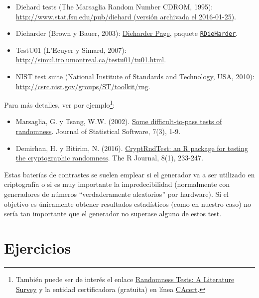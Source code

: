 \documentclass[
]{book}
\theoremstyle{break}
\theoremstyle{definition}
\theoremstyle{definition}
\theoremstyle{definition}
\theoremstyle{definition}
\theoremstyle{remark}
\begin{document}
\begin{itemize}
\item
  Diehard tests (The Marsaglia Random Number CDROM, 1995):
  \href{https://web.archive.org/web/20160125103112/http://stat.fsu.edu/pub/diehard}{http://www.stat.fsu.edu/pub/diehard (versión archivada el 2016-01-25)}.
\item
  Dieharder (Brown y Bauer, 2003):
  \href{https://webhome.phy.duke.edu/~rgb/General/dieharder.php}{Dieharder Page},
  paquete \href{https://github.com/eddelbuettel/rdieharder}{\texttt{RDieHarder}}.
\item
  TestU01 (L'Ecuyer y Simard, 2007):
  \url{http://simul.iro.umontreal.ca/testu01/tu01.html}.
\item
  NIST test suite (National Institute of Standards and Technology, USA, 2010):
  \url{http://csrc.nist.gov/groups/ST/toolkit/rng}.
\end{itemize}

Para más detalles, ver por ejemplo\footnote{También puede ser de interés el enlace \href{http://www.ciphersbyritter.com/RES/RANDTEST.HTM}{Randomness Tests: A Literature Survey} y la entidad certificadora (gratuita) en línea \href{http://www.cacert.at/random}{CAcert}.}:

\begin{itemize}
\item
  Marsaglia, G. y Tsang, W.W. (2002). \href{http://www.jstatsoft.org/v07/i03}{Some difficult-to-pass tests of randomness}. Journal of Statistical Software, 7(3), 1-9.
\item
  Demirhan, H. y Bitirim, N. (2016). \href{https://journal.r-project.org/archive/2016/RJ-2016-016/index.html}{CryptRndTest: an R package for testing the cryptographic randomness}. The R Journal, 8(1), 233-247.
\end{itemize}

Estas baterías de contrastes se suelen emplear si el generador va a ser utilizado en criptografía o si es muy importante la impredecibilidad (normalmente con generadores de números ``verdaderamente aleatorios'' por hardware).
Si el objetivo es únicamente obtener resultados estadísticos (como en nuestro caso) no sería tan importante que el generador no superase alguno de estos test.

\hypertarget{ejercicios-1}{%
\section{Ejercicios}\label{ejercicios-1}}
\end{document}
